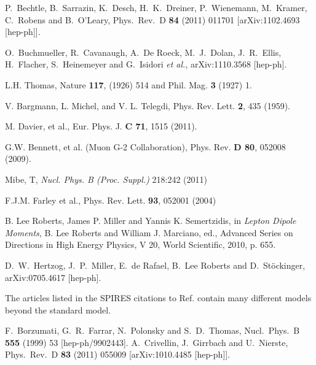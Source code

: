 \begin{thebibliography}{99}
  P.~Bechtle, B.~Sarrazin, K.~Desch, H.~K.~Dreiner, P.~Wienemann, M.~Kramer, C.~Robens and B.~O'Leary,
  Phys.\ Rev.\ D {\bf 84} (2011) 011701
  [arXiv:1102.4693 [hep-ph]].

  O.~Buchmueller, R.~Cavanaugh, A.~De Roeck, M.~J.~Dolan, J.~R.~Ellis, H.~Flacher, S.~Heinemeyer and G.~Isidori {\it et al.},
  arXiv:1110.3568 [hep-ph].



 L.H. Thomas, Nature {\bf 117}, (1926) 514 and
Phil. Mag. {\bf 3} (1927) 1.

 V. Bargmann, L.
Michel, and V. L. Telegdi, Phys. Rev. Lett. {\bf 2}, 435 (1959).

M. Davier, et al., Eur. Phys. J. {\bf C 71}, 1515 (2011).

 G.W. Bennett, et al. (Muon G-2 Collaboration),
 Phys. Rev. {\bf D 80}, 052008 (2009).




Mibe, T, \textit{Nucl. Phys. B (Proc. Suppl.)}
218:242 (2011)






  F.J.M. Farley et al.,
Phys. Rev. Lett. {\bf 93}, 052001 (2004)

 B. Lee Roberts, James P. Miller and Yannis
  K. Semertzidis, in {\it Lepton Dipole Moments}, B. Lee Roberts and William
  J. Marciano, ed., Advanced Series on Directions in High Energy Physics, V
  20, World Scientific, 2010, p. 655.






 D.~W.~Hertzog, J.~P.~Miller, E.~de Rafael, B.~Lee
Roberts and D.~St\"ockinger,
arXiv:0705.4617 [hep-ph]. %


  The articles listed in the
SPIRES citations to  Ref. \cite{Brown:2001mg} contain many different
models beyond the standard model.

  F.~Borzumati, G.~R.~Farrar, N.~Polonsky and S.~D.~Thomas,
  Nucl.\ Phys.\ B {\bf 555} (1999) 53
  [hep-ph/9902443].
  A.~Crivellin, J.~Girrbach and U.~Nierste,
  Phys.\ Rev.\ D {\bf 83} (2011) 055009
  [arXiv:1010.4485 [hep-ph]].


\end{thebibliography}
